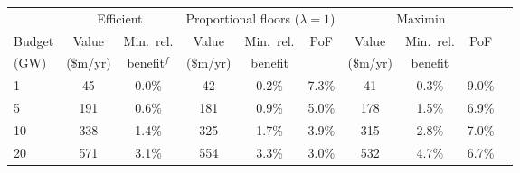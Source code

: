 \begin{tabular}{@{}lccccccccc@{}}
\toprule
 & \multicolumn{2}{c}{Efficient} & \multicolumn{3}{c}{Proportional floors ($\lambda=1$)} & \multicolumn{3}{c}{Maximin} \\
\cmidrule(lr){2-3}\cmidrule(lr){4-6}\cmidrule(lr){7-9}
Budget & Value & Min.\ rel. & Value & Min.\ rel. & PoF & Value & Min.\ rel. & PoF \\
 (GW) & (\$m/yr) & benefit$^f$ & (\$m/yr) & benefit & & (\$m/yr) & benefit & \\
\midrule
1 & 45 & 0.0\% & 42 & 0.2\% & 7.3\% & 41 & 0.3\% & 9.0\% \\
5 & 191 & 0.6\% & 181 & 0.9\% & 5.0\% & 178 & 1.5\% & 6.9\% \\
10 & 338 & 1.4\% & 325 & 1.7\% & 3.9\% & 315 & 2.8\% & 7.0\% \\
20 & 571 & 3.1\% & 554 & 3.3\% & 3.0\% & 532 & 4.7\% & 6.7\% \\
\bottomrule
\end{tabular}
